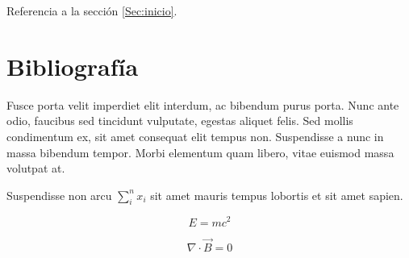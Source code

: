 \documentclass[a4paper]{article}
\begin{document}
Referencia a la sección \ref{Sec:inicio}.



\section*{Bibliografía}


Fusce porta velit imperdiet elit interdum, ac bibendum purus porta. Nunc ante odio, faucibus sed tincidunt vulputate, egestas aliquet felis. Sed mollis condimentum ex, sit amet consequat elit tempus non. Suspendisse a nunc in massa bibendum tempor. Morbi elementum quam libero, vitae euismod massa volutpat at.

Suspendisse non arcu $\sum_i ^n x_i$ sit amet mauris tempus lobortis et sit amet sapien. 

\begin{equation}
	E = mc^2
\end{equation}


\[
	\nabla \cdot %
	\vec{ B } = 0
\]
\end{document}
